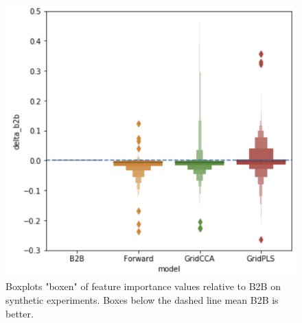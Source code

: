 \begin{figure}
  \centering
  \includegraphics[width=0.7\linewidth]{figures/delta_b2b.png}
  \caption{Boxplots "boxen" of feature importance values relative to B2B on synthetic experiments. Boxes below the dashed line mean B2B is better.}
  \label{}
\end{figure}

